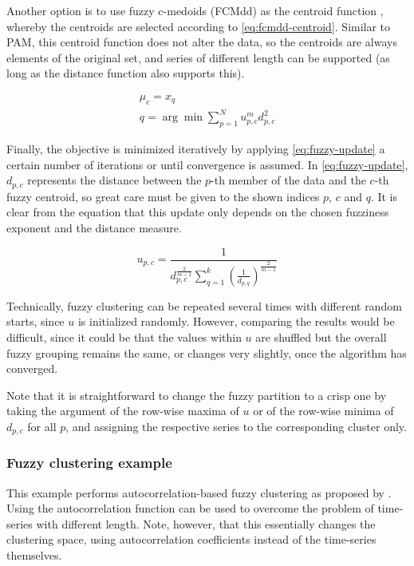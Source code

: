 Another option is to use fuzzy c-medoids (FCMdd) as the centroid function \citep{krishnapuram2001, izakian2015},
whereby the centroids are selected according to \cref{eq:fcmdd-centroid}.
Similar to PAM, this centroid function does not alter the data,
so the centroids are always elements of the original set,
and series of different length can be supported
(as long as the distance function also supports this).

\begin{subequations}
\label{eq:fcmdd-centroid}
\begin{gather}
\mu_c = x_q \\
q = \arg \min \sum^N_{p = 1} u^m_{p,c} d^2_{p,c}
\end{gather}
\end{subequations}

Finally, the objective is minimized iteratively by applying \cref{eq:fuzzy-update} a certain number of iterations or until convergence is assumed.
In \cref{eq:fuzzy-update},
$d_{p,c}$ represents the distance between the $p$-th member of the data and the $c$-th fuzzy centroid,
so great care must be given to the shown indices $p$, $c$ and $q$.
It is clear from the equation that this update only depends on the chosen fuzziness exponent and the distance measure.

\begin{equation}
\label{eq:fuzzy-update}
u_{p,c} = \frac{1}{d_{p,c} ^ \frac{2}{m - 1} \sum^k_{q=1} \left( \frac{1}{d_{p,q}} \right) ^ \frac{2}{m - 1}}
\end{equation}

Technically, fuzzy clustering can be repeated several times with different random starts,
since $u$ is initialized randomly.
However, comparing the results would be difficult,
since it could be that the values within $u$ are shuffled but the overall fuzzy grouping remains the same,
or changes very slightly,
once the algorithm has converged.

Note that it is straightforward to change the fuzzy partition to a crisp one by taking the argument of the row-wise maxima of $u$ or of the row-wise minima of $d_{p,c}$ for all $p$,
and assigning the respective series to the corresponding cluster only.

\subsubsection{Fuzzy clustering example}

This example performs autocorrelation-based fuzzy clustering as proposed by \citet{durso2009}.
Using the autocorrelation function can be used to overcome the problem of time-series with different length.
Note, however, that this essentially changes the clustering space,
using autocorrelation coefficients instead of the time-series themselves.

